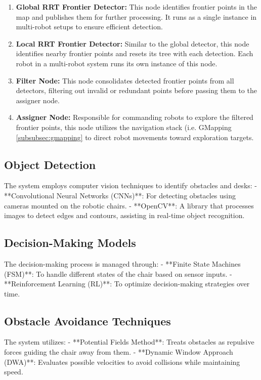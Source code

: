 \documentclass[a4paper,twocolumn]{article}
\begin{document}
\begin{enumerate}
    \item \textbf{Global RRT Frontier Detector:} This node identifies frontier points in the map and publishes them for further processing. It runs as a single instance in multi-robot setups to ensure efficient detection.
    
    \item \textbf{Local RRT Frontier Detector:} Similar to the global detector, this node identifies nearby frontier points and resets its tree with each detection. Each robot in a multi-robot system runs its own instance of this node.
    
    \item \textbf{Filter Node:} This node consolidates detected frontier points from all detectors, filtering out invalid or redundant points before passing them to the assigner node.
    
    \item \textbf{Assigner Node:} Responsible for commanding robots to explore the filtered frontier points, this node utilizes the navigation stack (i.e. GMapping \ref{subsubsec:gmapping} to direct robot movements toward exploration targets.
\end{enumerate}

\subsection{Object Detection}
The system employs computer vision techniques to identify obstacles and desks:
- **Convolutional Neural Networks (CNNs)**: For detecting obstacles using cameras mounted on the robotic chairs.
- **OpenCV**: A library that processes images to detect edges and contours, assisting in real-time object recognition.

\subsection{Decision-Making Models}
The decision-making process is managed through:
- **Finite State Machines (FSM)**: To handle different states of the chair based on sensor inputs.
- **Reinforcement Learning (RL)**: To optimize decision-making strategies over time.

\subsection{Obstacle Avoidance Techniques}
The system utilizes:
- **Potential Fields Method**: Treats obstacles as repulsive forces guiding the chair away from them.
- **Dynamic Window Approach (DWA)**: Evaluates possible velocities to avoid collisions while maintaining speed.
\end{document}
